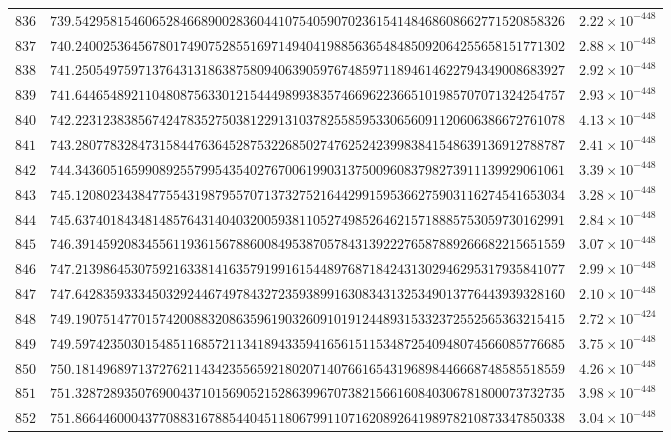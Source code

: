 \documentclass[12pt,reqno]{amsart}
\theoremstyle{remark}
\begin{document}
\begin{longtable}{clc}
$836$ & $739.5429581546065284668900283604410754059070236154148468608662771520858326$ & $2.22\times 10^{-448}$ \\
$837$ & $740.2400253645678017490752855169714940419885636548485092064255658151771302$ & $2.88\times 10^{-448}$ \\
$838$ & $741.2505497597137643131863875809406390597674859711894614622794349008683927$ & $2.92\times 10^{-448}$ \\
$839$ & $741.6446548921104808756330121544498993835746696223665101985707071324254757$ & $2.93\times 10^{-448}$ \\
$840$ & $742.2231238385674247835275038122913103782558595330656091120606386672761078$ & $4.13\times 10^{-448}$ \\
$841$ & $743.2807783284731584476364528753226850274762524239983841548639136912788787$ & $2.41\times 10^{-448}$ \\
$842$ & $744.3436051659908925579954354027670061990313750096083798273911139929061061$ & $3.39\times 10^{-448}$ \\
$843$ & $745.1208023438477554319879557071373275216442991595366275903116274541653034$ & $3.28\times 10^{-448}$ \\
$844$ & $745.6374018434814857643140403200593811052749852646215718885753059730162991$ & $2.84\times 10^{-448}$ \\
$845$ & $746.3914592083455611936156788600849538705784313922276587889266682215651559$ & $3.07\times 10^{-448}$ \\
$846$ & $747.2139864530759216338141635791991615448976871842431302946295317935841077$ & $2.99\times 10^{-448}$ \\
$847$ & $747.6428359333450329244674978432723593899163083431325349013776443939328160$ & $2.10\times 10^{-448}$ \\
$848$ & $749.1907514770157420088320863596190326091019124489315332372552565363215415$ & $2.72\times 10^{-424}$ \\
$849$ & $749.5974235030154851168572113418943359416561511534872540948074566085776685$ & $3.75\times 10^{-448}$ \\
$850$ & $750.1814968971372762114342355659218020714076616543196898446668748585518559$ & $4.26\times 10^{-448}$ \\
$851$ & $751.3287289350769004371015690521528639967073821566160840306781800073732735$ & $3.98\times 10^{-448}$ \\
$852$ & $751.8664460004377088316788544045118067991107162089264198978210873347850338$ & $3.04\times 10^{-448}$ \\

\end{longtable}
\end{document}
